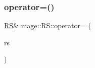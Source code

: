 \hypertarget{structmage_1_1_r_s_a2347c2cf4619806ed4d9e39ad3f8d6dd}{}\label{structmage_1_1_r_s_a2347c2cf4619806ed4d9e39ad3f8d6dd} 
\subsubsection{\texorpdfstring{operator=()}{operator=()}\hspace{0.1cm}{\footnotesize\ttfamily [2/2]}}
{\footnotesize\ttfamily \hyperlink{structmage_1_1_r_s}{RS}\& mage\+::\+R\+S\+::operator= (\begin{DoxyParamCaption}\item[{\hyperlink{structmage_1_1_r_s}{RS} \&\&}]{rs }\end{DoxyParamCaption})\hspace{0.3cm}{\ttfamily [delete]}}

